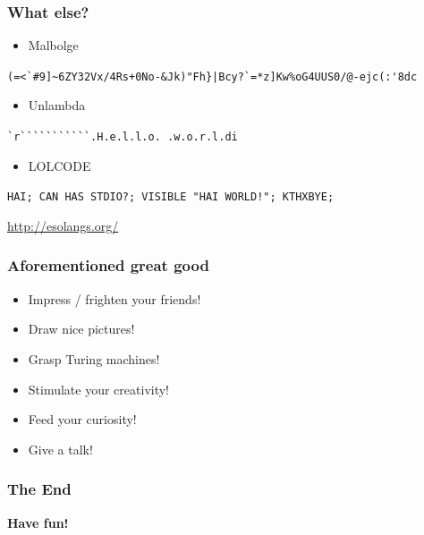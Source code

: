 \documentclass[17pt]{beamer}
\renewcommand{\(}[1]{\begin{columns}[#1]}
\renewcommand{\)}{\end{columns}}
\newcommand{\<}[1]{\begin{column}{#1}}
\renewcommand{\>}{\end{column}}
\begin{document}

\begin{frame}[fragile]
  \frametitle{What else?}
  \begin{itemize}
  \item Malbolge
  \end{itemize}
  \begin{center}
    \vspace{-1cm}
    {\tiny \verb;(=<`#9]~6ZY32Vx/4Rs+0No-&Jk)"Fh}|Bcy?`=*z]Kw%oG4UUS0/@-ejc(:'8dc;}
  \end{center}

  \vspace{-0.5cm}

  \begin{itemize}
    \item Unlambda
  \end{itemize}
  \begin{center}
    \vspace{-1cm}
    {\tiny \verb+`r```````````.H.e.l.l.o. .w.o.r.l.di+}
  \end{center}

  \vspace{-0.5cm}

  \begin{itemize}
    \item LOLCODE
  \end{itemize}
  \begin{center}
    \vspace{-1cm}
    {\tiny \verb+HAI; CAN HAS STDIO?; VISIBLE "HAI WORLD!"; KTHXBYE;+}
  \end{center}

  \pause

  \begin{center}
    {\tiny \url{http://esolangs.org/}}
  \end{center}

\end{frame}




\begin{frame}
  \frametitle{Aforementioned great good}
  \begin{itemize}
  \item Impress / frighten your friends!
  \item Draw nice pictures!
  \end{itemize}
  \pause
  \begin{itemize}
  \item Grasp Turing machines!
  \item Stimulate your creativity!
  \item Feed your curiosity!
  \end{itemize}
  \pause
  \begin{itemize}
  \item Give a talk! \smiley
  \end{itemize}
\end{frame}




\begin{frame}
  \frametitle{The End}
  \begin{center}
    \textbf{Have fun!}
  \end{center}
\end{frame}



\end{document}
